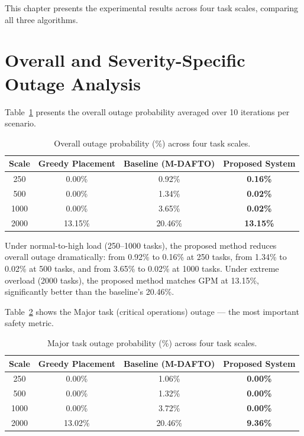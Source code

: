 
\noindent This chapter presents the experimental results across four task scales, comparing all three algorithms.

\section{Overall and Severity-Specific Outage Analysis}

Table~\ref{tab:overall_outage} presents the overall outage probability averaged over 10 iterations per scenario.

\begin{table}[htbp]
\centering
\begin{tabular}{|c|c|c|c|}
\hline
\textbf{Scale} & \textbf{Greedy Placement} & \textbf{Baseline (M-DAFTO)} & \textbf{Proposed System} \\
\hline
250  & 0.00\% & 0.92\% & \textbf{0.16\%} \\
500  & 0.00\% & 1.34\% & \textbf{0.02\%} \\
1000 & 0.00\% & 3.65\% & \textbf{0.02\%} \\
2000 & 13.15\% & 20.46\% & \textbf{13.15\%} \\
\hline
\end{tabular}
\caption{Overall outage probability (\%) across four task scales.}
\label{tab:overall_outage}
\end{table}

Under normal-to-high load (250--1000 tasks), the proposed method reduces overall outage dramatically: from 0.92\% to 0.16\% at 250 tasks, from 1.34\% to 0.02\% at 500 tasks, and from 3.65\% to 0.02\% at 1000 tasks. Under extreme overload (2000 tasks), the proposed method matches GPM at 13.15\%, significantly better than the baseline's 20.46\%.

Table~\ref{tab:major_outage} shows the Major task (critical operations) outage --- the most important safety metric.

\begin{table}[htbp]
\centering
\begin{tabular}{|c|c|c|c|}
\hline
\textbf{Scale} & \textbf{Greedy Placement} & \textbf{Baseline (M-DAFTO)} & \textbf{Proposed System} \\
\hline
250  & 0.00\% & 1.06\% & \textbf{0.00\%} \\
500  & 0.00\% & 1.32\% & \textbf{0.00\%} \\
1000 & 0.00\% & 3.72\% & \textbf{0.00\%} \\
2000 & 13.02\% & 20.46\% & \textbf{9.36\%} \\
\hline
\end{tabular}
\caption{Major task outage probability (\%) across four task scales.}
\label{tab:major_outage}
\end{table}

